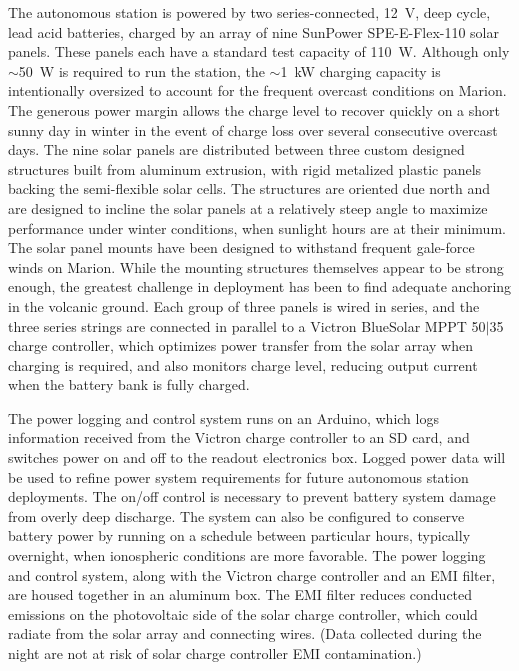 \documentclass{ws-jai}
\begin{document}
The autonomous station is powered by two series-connected, 12~V, deep
cycle, lead acid batteries, charged by an array of nine SunPower
SPE-E-Flex-110 solar panels. These panels each have a standard test
capacity of 110~W. Although only $\sim$50~W is required to run the
station, the $\sim$1~kW charging capacity is intentionally oversized
to account for the frequent overcast conditions on Marion.  The
generous power margin allows the charge level to recover quickly on a
short sunny day in winter in the event of charge loss over several
consecutive overcast days.  The nine solar panels are distributed
between three custom designed structures built from aluminum
extrusion, with rigid metalized plastic panels backing the
semi-flexible solar cells. The structures are oriented due north and
are designed to incline the solar panels at a relatively steep angle
to maximize performance under winter conditions, when sunlight hours
are at their minimum. The solar panel mounts have been designed to
withstand frequent gale-force winds on Marion. While the mounting
structures themselves appear to be strong enough, the greatest
challenge in deployment has been to find adequate anchoring in the
volcanic ground.  Each group of three panels is wired in series, and
the three series strings are connected in parallel to a Victron
BlueSolar MPPT 50$\vert$35 charge controller, which optimizes power
transfer from the solar array when charging is required, and also
monitors charge level, reducing output current when the battery bank
is fully charged.

The power logging and control system runs on an Arduino, which logs
information received from the Victron charge controller to an SD card,
and switches power on and off to the readout electronics box. Logged
power data will be used to refine power system requirements for future
autonomous station deployments. The on/off control is necessary to
prevent battery system damage from overly deep discharge. The system
can also be configured to conserve battery power by running on a
schedule between particular hours, typically overnight, when
ionospheric conditions are more favorable.  The power logging and
control system, along with the Victron charge controller and an EMI
filter, are housed together in an aluminum box. The EMI filter reduces
conducted emissions on the photovoltaic side of the solar charge
controller, which could radiate from the solar array and connecting
wires. (Data collected during the night are not at risk of solar
charge controller EMI contamination.)
\end{document}
